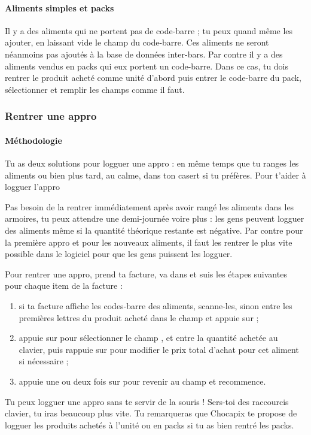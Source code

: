\documentclass[12pt,french]{article}
\begin{document}
\paragraph{Aliments simples et packs} Il y a des aliments qui ne portent pas de code-barre ; tu peux quand même les ajouter, en laissant vide le champ du code-barre. Ces aliments ne seront néanmoins pas ajoutés à la base de données inter-bars. Par contre il y a des aliments vendus en packs qui eux portent un code-barre. Dans ce cas, tu dois rentrer le produit acheté comme unité d'abord puis entrer le code-barre du pack, sélectionner  et remplir les champs comme il faut.

\subsubsection{Rentrer une appro}

\paragraph{Méthodologie} Tu as deux solutions pour logguer une appro : en même temps que tu ranges les aliments ou bien plus tard, au calme, dans ton casert si tu préfères. Pour t'aider à logguer l'appro

Pas besoin de la rentrer immédiatement après avoir rangé les aliments dans les armoires, tu peux attendre une demi-journée voire plus : les gens peuvent logguer des aliments même si la quantité théorique restante est négative. Par contre pour la première appro et pour les nouveaux aliments, il faut les rentrer le plus vite possible dans le logiciel pour que les gens puissent les logguer.

Pour rentrer une appro, prend ta facture, va dans  et suis les étapes suivantes pour chaque item de la facture :
\begin{enumerate}
	\item si ta facture affiche les codes-barre des aliments, scanne-les, sinon entre les premières lettres du produit acheté dans le champ  et appuie sur  ;
	\item appuie sur  pour sélectionner le champ , et entre la quantité achetée au clavier, puis rappuie sur  pour modifier le prix total d'achat pour cet aliment si nécessaire ;
	\item appuie une ou deux fois sur  pour revenir au champ  et recommence.
\end{enumerate}
Tu peux logguer une appro sans te servir de la souris ! Sers-toi des raccourcis clavier, tu iras beaucoup plus vite. Tu remarqueras que Chocapix te propose de logguer les produits achetés à l'unité ou en packs si tu as bien rentré les packs.
\end{document}
